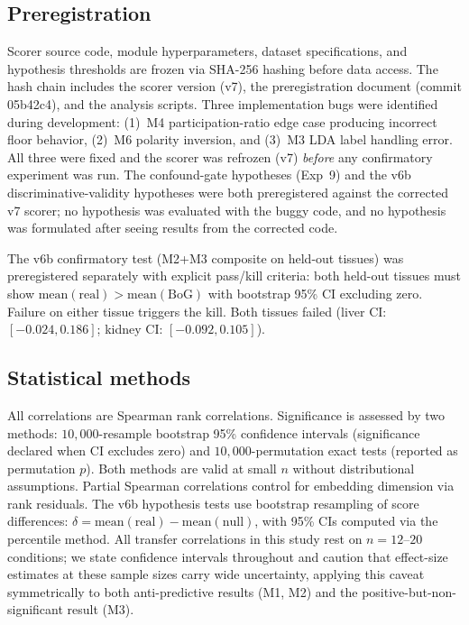 \documentclass[9pt,lineno]{elife}
\begin{document}
\subsection{Preregistration}

Scorer source code, module hyperparameters, dataset specifications, and hypothesis thresholds are frozen via SHA-256 hashing before data access. The hash chain includes the scorer version (v7), the preregistration document (commit 05b42c4), and the analysis scripts. Three implementation bugs were identified during development: (1)~M4 participation-ratio edge case producing incorrect floor behavior, (2)~M6 polarity inversion, and (3)~M3 LDA label handling error. All three were fixed and the scorer was refrozen (v7) \emph{before} any confirmatory experiment was run. The confound-gate hypotheses (Exp~9) and the v6b discriminative-validity hypotheses were both preregistered against the corrected v7 scorer; no hypothesis was evaluated with the buggy code, and no hypothesis was formulated after seeing results from the corrected code.

The v6b confirmatory test (M2+M3 composite on held-out tissues) was preregistered separately with explicit pass/kill criteria: both held-out tissues must show $\text{mean}(\text{real}) > \text{mean}(\text{BoG})$ with bootstrap 95\% CI excluding zero. Failure on either tissue triggers the kill. Both tissues failed (liver CI: $[-0.024, 0.186]$; kidney CI: $[-0.092, 0.105]$).

\subsection{Statistical methods}

All correlations are Spearman rank correlations. Significance is assessed by two methods: $10{,}000$-resample bootstrap 95\% confidence intervals (significance declared when CI excludes zero) and $10{,}000$-permutation exact tests (reported as permutation $p$). Both methods are valid at small $n$ without distributional assumptions. Partial Spearman correlations control for embedding dimension via rank residuals. The v6b hypothesis tests use bootstrap resampling of score differences: $\delta = \text{mean}(\text{real}) - \text{mean}(\text{null})$, with 95\% CIs computed via the percentile method. All transfer correlations in this study rest on $n = 12$--$20$ conditions; we state confidence intervals throughout and caution that effect-size estimates at these sample sizes carry wide uncertainty, applying this caveat symmetrically to both anti-predictive results (M1, M2) and the positive-but-non-significant result (M3).
\end{document}
